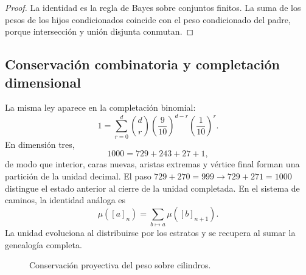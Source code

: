 \begin{proof}
La identidad es la regla de Bayes sobre conjuntos finitos. La suma de los
pesos de los hijos condicionados coincide con el peso condicionado del padre,
porque intersección y unión disjunta conmutan.
\end{proof}

\subsection{Conservación combinatoria y completación dimensional}

La misma ley aparece en la completación binomial:
\[
 1=\sum_{r=0}^{d}\binom dr
 \left(\frac9{10}\right)^{d-r}
 \left(\frac1{10}\right)^r.
\]
En dimensión tres,
\[
 1000=729+243+27+1,
\]
de modo que interior, caras nuevas, aristas extremas y vértice final forman
una partición de la unidad decimal. El paso
\(729+270=999\to729+271=1000\) distingue el estado anterior al cierre de la
unidad completada. En el sistema de caminos, la identidad análoga es
\[
 \mu([a]_n)=\sum_{b\mapsto a}\mu([b]_{n+1}).
\]
La unidad evoluciona al distribuirse por los estratos y se recupera al sumar
la genealogía completa.

\begin{figure}[htbp]
\centering
{}
\caption{Conservación proyectiva del peso sobre cilindros.}
\label{p12-83-c6-s1:fig:conservacion-peso-cilindros}
\end{figure}

